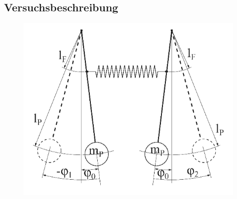 \documentclass[12pt,a4paper]{article}
\begin{document}
\subsection{Versuchsbeschreibung}
\begin{figure}[H]
\centering
\includegraphics[scale=0.5]{Bilder/Gekoppeltes-Pendel.PNG}
\end{figure}
\end{document}
